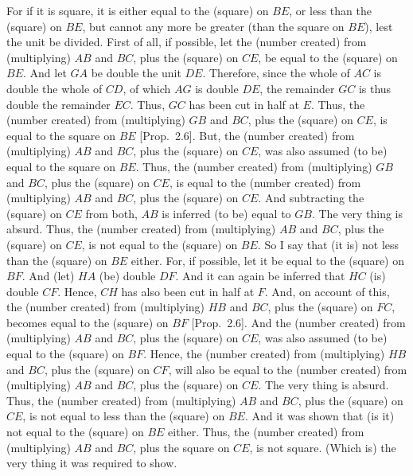 \begin{Parallel}{}{}
{For if it is square, it is either equal to the (square) on $BE$, or
less than the (square) on $BE$, but cannot    any more be greater  (than the square on $BE$), lest the unit be divided. First of all, if possible, let the
(number created) from (multiplying) $AB$ and $BC$, plus the (square) on
$CE$, be equal to the (square) on $BE$. And let $GA$ be double the unit
$DE$. Therefore, since the whole of $AC$ is double the whole
of $CD$, of which $AG$ is double $DE$, the remainder $GC$
is thus double the remainder $EC$. Thus, $GC$ has been cut in half at $E$.
Thus, the (number created) from (multiplying) $GB$ and $BC$,
plus the (square) on $CE$, is equal to the square on $BE$ [Prop.~2.6]. But, the (number created) from (multiplying) $AB$ and $BC$, plus the (square) on $CE$, was also assumed
 (to be) equal to the square on $BE$. Thus, the (number created) from
 (multiplying) $GB$ and $BC$, plus the (square) on $CE$, is equal to
 the (number created) from (multiplying)  $AB$ and $BC$, plus the
 (square) on $CE$. And subtracting the (square) on $CE$ from both, $AB$ is  inferred (to be) equal to $GB$. The very thing is absurd. Thus, the (number created) from (multiplying) $AB$ and $BC$, plus the (square) on
$CE$, is not equal to the (square) on $BE$. So I say that (it is) not
less than the (square) on $BE$ either. For, if possible, let it be equal to
the (square) on $BF$. And (let) $HA$ (be) double $DF$. And it
can again be inferred that $HC$ (is) double $CF$. Hence, $CH$ has
also been cut in half at $F$. And, on account of this, the (number created)
from (multiplying) $HB$ and $BC$, plus the (square) on $FC$, becomes
equal to the (square) on $BF$ [Prop.~2.6]. 
And the (number created) from (multiplying) $AB$ and $BC$, plus the
(square) on $CE$, was also
assumed (to be) equal to the (square) on $BF$.
Hence,
the (number created) from (multiplying) $HB$ and $BC$, plus the
(square) on $CF$, will also be equal to the
(number created) from (multiplying) $AB$ and $BC$, plus the (square) on $CE$. The very thing is
absurd. Thus, the (number created) from (multiplying) $AB$ and $BC$,
plus the (square) on $CE$, is not equal to less than the
(square) on $BE$. And it was shown that  (is it) not equal to the (square)
on $BE$ either. Thus, the (number created) from (multiplying)
$AB$ and $BC$, plus the  square on $CE$, is not square. (Which is)
the very thing it was required to show.}
\end{Parallel}

